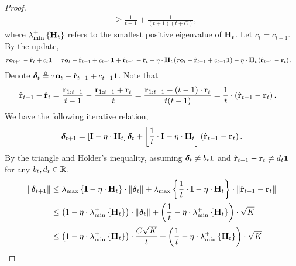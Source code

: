 \begin{proof}
\begin{equation*}
\begin{split}
    &\ge \frac{1}{t+1} + \frac{1}{(t+1)(t+C)},
\end{split}
\end{equation*}
where $\lambda_{\min}^{+}\left\{ {\mathbf{H}}_t \right\}$ refers to the smallest positive eigenvalue of ${\mathbf{H}}_t$. Let $c_{t} = c_{t-1}$. By the update,
\begin{equation*}
\begin{split}
    \tau {\mathbf{o}}_{t+1} - \hat{{\mathbf{r}}}_t + c_{t} {\mathbf{1}} &= \tau {\mathbf{o}}_{t} - \hat{{\mathbf{r}}}_{t-1} + c_{t-1} {\mathbf{1}} + \hat{{\mathbf{r}}}_{t-1} - \hat{{\mathbf{r}}}_t - \eta \cdot {\mathbf{H}}_t \left( \tau {\mathbf{o}}_{t} - \hat{{\mathbf{r}}}_{t-1} + c_{t-1} {\mathbf{1}} \right) - \eta \cdot {\mathbf{H}}_t \left( \hat{{\mathbf{r}}}_{t-1} - {\mathbf{r}}_t \right).
\end{split}
\end{equation*}
Denote ${\boldsymbol{\delta}}_{t} \triangleq \tau {\mathbf{o}}_{t} - \hat{{\mathbf{r}}}_{t-1} + c_{t-1} {\mathbf{1}}$. Note that
\begin{equation*}
\begin{split}
    \hat{{\mathbf{r}}}_{t-1} - \hat{{\mathbf{r}}}_t &= \frac{{\mathbf{r}}_{1:t-1}}{t-1} - \frac{{\mathbf{r}}_{1:t-1} + {\mathbf{r}}_t}{t} = \frac{{\mathbf{r}}_{1:t-1} - (t-1) \cdot {\mathbf{r}}_t }{t(t-1)} = \frac{1}{t} \cdot \left( \hat{{\mathbf{r}}}_{t-1} - {\mathbf{r}}_t \right).
\end{split}
\end{equation*}
We have the following iterative relation,
\begin{equation*}
\begin{split}
    {\boldsymbol{\delta}}_{t+1} = \left[ {\mathbf{I}} - \eta \cdot {\mathbf{H}}_t \right] {\boldsymbol{\delta}}_t + \left[ \frac{1}{t} \cdot {\mathbf{I}} - \eta \cdot {\mathbf{H}}_t \right] \left( \hat{{\mathbf{r}}}_{t-1} - {\mathbf{r}}_t \right).
\end{split}
\end{equation*}
By the triangle and H{\" o}lder's inequality, assuming ${\boldsymbol{\delta}}_t \not= b_t {\mathbf{1}}$ and $\hat{{\mathbf{r}}}_{t-1} - {\mathbf{r}}_t \not= d_t {\mathbf{1}}$ for any $b_t, d_t \in {\mathbb{R}}$,
\begin{equation*}
\begin{split}
    \left\| \rvdelta_{t+1} \right\| &\le \lambda_{\max}\left\{ \rmI - \eta \cdot \rmH_t \right\} \cdot \left\| \rvdelta_{t} \right\| + \lambda_{\max}\left\{ \frac{1}{t} \cdot \rmI - \eta \cdot \rmH_t \right\} \cdot \left\| \hat{\rvr}_{t-1} - \rvr_t \right\| \\
    &\le \left( 1 - \eta \cdot \lambda_{\min}^{+}\left\{ \rmH_t \right\} \right) \cdot \left\| \rvdelta_{t} \right\| + \left( \frac{1}{t} - \eta \cdot \lambda_{\min}^{+}\left\{ \rmH_t \right\} \right) \cdot \sqrt{K} \\
    &\le \left( 1 - \eta \cdot \lambda_{\min}^{+}\left\{ \rmH_t \right\} \right) \cdot \frac{C \sqrt{K}}{t} + \left( \frac{1}{t} - \eta \cdot \lambda_{\min}^{+}\left\{ \rmH_t \right\} \right) \cdot \sqrt{K} \\

\end{split}
\end{equation*}
\end{proof}
